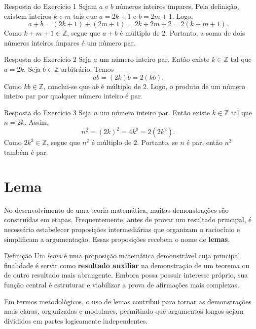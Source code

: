 \documentclass[12pt,a4paper,openright]{book}
\begin{document}
\begin{block}{Resposta do Exercício 1}
Sejam \(a\) e \(b\) números inteiros ímpares. Pela definição, existem inteiros \(k\) e \(m\) tais que \(a = 2k + 1\) e \(b = 2m + 1\). Logo,
\[
a + b = (2k + 1) + (2m + 1) = 2k + 2m + 2 = 2(k + m + 1).
\]
Como \(k + m + 1 \in \mathbb{Z}\), segue que \(a + b\) é múltiplo de \(2\). Portanto, a soma de dois números inteiros ímpares é um número par.
\end{block}

\begin{block}{Resposta do Exercício 2}
Seja \(a\) um número inteiro par. Então existe \(k \in \mathbb{Z}\) tal que \(a = 2k\). Seja \(b \in \mathbb{Z}\) arbitrário. Temos
\[
ab = (2k)b = 2(kb).
\]
Como \(kb \in \mathbb{Z}\), conclui-se que \(ab\) é múltiplo de \(2\). Logo, o produto de um número inteiro par por qualquer número inteiro é par.
\end{block}

\begin{block}{Resposta do Exercício 3}
Seja \(n\) um número inteiro par. Então existe \(k \in \mathbb{Z}\) tal que \(n = 2k\). Assim,
\[
n^2 = (2k)^2 = 4k^2 = 2(2k^2).
\]
Como \(2k^2 \in \mathbb{Z}\), segue que \(n^2\) é múltiplo de \(2\). Portanto, se \(n\) é par, então \(n^2\) também é par.
\end{block}\section{Lema}

No desenvolvimento de uma teoria matemática, muitas demonstrações são construídas em etapas. Frequentemente, antes de provar um resultado principal, é necessário estabelecer proposições intermediárias que organizam o raciocínio e simplificam a argumentação. Essas proposições recebem o nome de \textbf{lemas}.

\begin{block}{Definição}
Um \emph{lema} é uma proposição matemática demonstrável cuja principal finalidade é servir como \textbf{resultado auxiliar} na demonstração de um teorema ou de outro resultado mais abrangente. Embora possa possuir interesse próprio, sua função central é estruturar e viabilizar a prova de afirmações mais complexas.
\end{block}

Em termos metodológicos, o uso de lemas contribui para tornar as demonstrações mais claras, organizadas e modulares, permitindo que argumentos longos sejam divididos em partes logicamente independentes.
\end{document}

